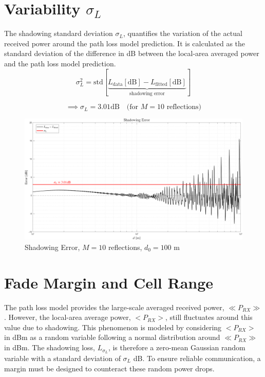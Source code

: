\section{Variability $\sigma_L$}
The shadowing standard deviation $\sigma_L$, quantifies the variation of the actual received power around the path loss model prediction. It is calculated as the standard deviation of the difference in dB between the local-area averaged power and the path loss model prediction.
\begin{equation}
	\sigma_L^2 = \mathrm{std} \left[ 
	\underbrace{L_{\mathrm{data}}[\mathrm{dB}] - L_{\mathrm{fitted}}[\mathrm{dB}]}_{\text{shadowing error}}
	\right]
\end{equation}

\begin{equation}
	\implies \boxed{\sigma_L = 3.01 \mathrm{dB}} \quad \text{(for $M = 10$ reflections)}
\end{equation}

\begin{figure}
	\centering
	\includegraphics[width=1\linewidth]{"content/4-images/Shadowing Error"}
	\caption{Shadowing Error, $M = 10$ reflections, $d_0 = 100$ m}
	\label{fig:shadowing-error}
\end{figure}

\section{Fade Margin and Cell Range}
The path loss model provides the large-scale averaged received power, $\ll P_{RX} \gg$. However, the local-area average power, $<P_{RX}>$, still fluctuates around this value due to shadowing. This phenomenon is modeled by considering $<P_{RX}>$ in dBm as a random variable following a normal distribution around $\ll P_{RX} \gg$ in dBm. The shadowing loss, $L_{\sigma_L}$, is therefore a zero-mean Gaussian random variable with a standard deviation of $\sigma_L$ dB. To ensure reliable communication, a margin must be designed to counteract these random power drops.

